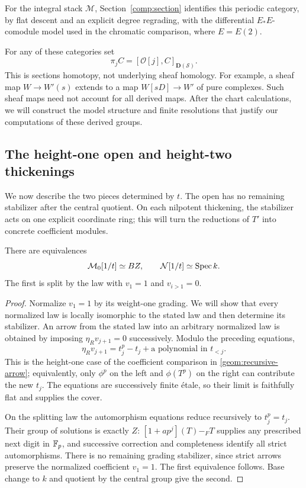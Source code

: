 For the integral stack $\mathcal M$, Section~\ref{comp:section}
identifies this periodic category, by flat descent and an explicit
degree regrading, with the differential $E_*E$-comodule model used in
the chromatic comparison, where $E=E(2)$.

For any of these categories set
\begin{equation}\label{geom:sections-homotopy}
 \pi_j C=[\mathcal O[j],C]_{\mathbf D(\mathcal S)}.
\end{equation}
This is sections homotopy, not underlying sheaf homology.  For example,
a sheaf map $W\to W'(s)$ extends to a map $W[sD]\to W'$ of pure
complexes.  Such sheaf maps need not account for all derived maps.
After the chart calculations, we will construct the model structure
and finite resolutions that justify our computations of these derived
groups.

\subsection{The height-one open and height-two thickenings}

We now describe the two pieces determined by $t$.  The open has no
remaining stabilizer after the central quotient.  On each nilpotent
thickening, the stabilizer acts on one explicit coordinate ring; this
will turn the reductions of $T'$ into concrete coefficient modules.

\begin{proposition}\label{geom:open}
There are equivalences
\[
 \mathcal M_0[1/t]\simeq BZ,\qquad
 \mathcal N[1/t]\simeq\operatorname{Spec} k.
\]
The first is split by the law with $v_1=1$ and $v_{i>1}=0$.
\end{proposition}

\begin{proof}
Normalize $v_1=1$ by its weight-one grading.  We will show that every
normalized law is locally isomorphic to the stated law and then
determine its stabilizer.  An arrow from the stated law into an arbitrary
normalized law is obtained by imposing
$\eta_Rv_{j+1}=0$ successively.  Modulo the preceding equations,
\[
 \eta_Rv_{j+1}=t_j^p-t_j
                    +\text{a polynomial in }t_{<j}.
\]
This is the height-one case of the coefficient comparison in
\eqref{geom:recursive-arrow}; equivalently, only $\phi^p$ on the
left and $\phi(T^p)$ on the right can contribute the new $t_j$.
The equations are successively finite \'etale, so their limit is
faithfully flat and supplies the cover.

On the splitting law the automorphism equations reduce recursively
to $t_j^p=t_j$.  Their group of solutions is exactly $Z$:
$[1+ap^j](T)-_F T$ supplies any prescribed next digit in $\mathbb F_p$,
and successive correction and completeness identify all strict
automorphisms.  There is no remaining grading stabilizer, since
strict arrows preserve the normalized coefficient $v_1=1$.
The first equivalence follows.  Base change to $k$ and quotient by
the central group give the second.
\end{proof}

